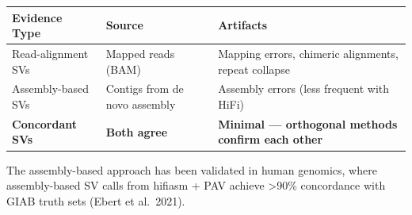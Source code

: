 \documentclass[
]{article}
\begin{document}
\begin{longtable}[]{@{}lll@{}}
\toprule
\begin{minipage}[b]{0.39\columnwidth}\raggedright
Evidence Type\strut
\end{minipage} & \begin{minipage}[b]{0.22\columnwidth}\raggedright
Source\strut
\end{minipage} & \begin{minipage}[b]{0.30\columnwidth}\raggedright
Artifacts\strut
\end{minipage}\tabularnewline
\midrule
\endhead
\begin{minipage}[t]{0.39\columnwidth}\raggedright
Read-alignment SVs\strut
\end{minipage} & \begin{minipage}[t]{0.22\columnwidth}\raggedright
Mapped reads (BAM)\strut
\end{minipage} & \begin{minipage}[t]{0.30\columnwidth}\raggedright
Mapping errors, chimeric alignments, repeat collapse\strut
\end{minipage}\tabularnewline
\begin{minipage}[t]{0.39\columnwidth}\raggedright
Assembly-based SVs\strut
\end{minipage} & \begin{minipage}[t]{0.22\columnwidth}\raggedright
Contigs from de novo assembly\strut
\end{minipage} & \begin{minipage}[t]{0.30\columnwidth}\raggedright
Assembly errors (less frequent with HiFi)\strut
\end{minipage}\tabularnewline
\begin{minipage}[t]{0.39\columnwidth}\raggedright
\textbf{Concordant SVs}\strut
\end{minipage} & \begin{minipage}[t]{0.22\columnwidth}\raggedright
\textbf{Both agree}\strut
\end{minipage} & \begin{minipage}[t]{0.30\columnwidth}\raggedright
\textbf{Minimal --- orthogonal methods confirm each other}\strut
\end{minipage}\tabularnewline
\bottomrule
\end{longtable}

The assembly-based approach has been validated in human genomics, where
assembly-based SV calls from hifiasm + PAV achieve \textgreater90\%
concordance with GIAB truth sets (Ebert et al.~2021).
\end{document}
